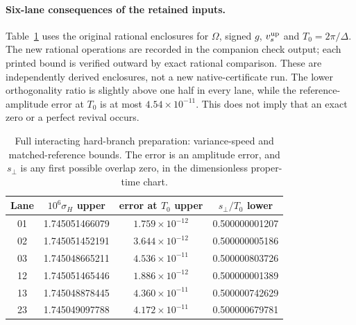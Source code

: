 \paragraph{Six-lane consequences of the retained inputs.}
Table~\ref{tab:ch6-route-clock-bounds} uses the original rational enclosures
for $\Omega$, signed $g$, $v_s^{\rm up}$ and $T_0=2\pi/\Delta$.
The new rational operations are recorded in the companion check output;
each printed bound is verified outward by exact rational comparison.
These are independently derived enclosures, not a new native-certificate run.
The lower orthogonality ratio is slightly above one half in every lane,
while the reference-amplitude error at $T_0$ is at most $4.54\times10^{-11}$.
This does not imply that an exact zero or a perfect revival occurs.
\begin{table}[ht]
\centering\scriptsize
\begin{tabular}{c c c c}
\hline
Lane & $10^6\sigma_H$ upper & error at $T_0$ upper & $s_\perp/T_0$ lower\\
\hline
01 & 1.745051466079 & $1.759\times10^{-12}$ & 0.500000001207\\
02 & 1.745051452191 & $3.644\times10^{-12}$ & 0.500000005186\\
03 & 1.745048665211 & $4.536\times10^{-11}$ & 0.500000803726\\
12 & 1.745051465446 & $1.886\times10^{-12}$ & 0.500000001389\\
13 & 1.745048878445 & $4.360\times10^{-11}$ & 0.500000742629\\
23 & 1.745049097788 & $4.172\times10^{-11}$ & 0.500000679781\\
\hline
\end{tabular}
\caption{Full interacting hard-branch preparation: variance-speed and
matched-reference bounds. The error is an amplitude error, and $s_\perp$
is any first possible overlap zero, in the dimensionless proper-time chart.}
\label{tab:ch6-route-clock-bounds}
\end{table}


